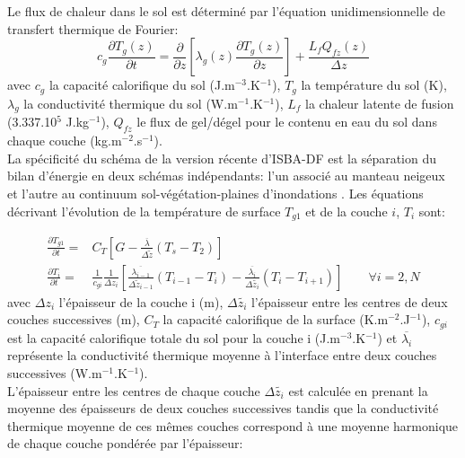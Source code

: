 \noindent Le flux de chaleur dans le sol est déterminé par l'équation unidimensionnelle de transfert thermique de Fourier:
\begin{equation}
\label{eq:heat_trans}
c_{g}\frac{\partial T_{g} (z)}{\partial t} = \frac{\partial }{\partial z}\left[\lambda_{g}(z)\frac{\partial T_{g} (z)}{\partial z}\right] + \frac{L_{f}Q_{fz}(z)}{\Delta z}
\end{equation}
avec $c_{g}$ la capacité calorifique du sol (J.m$^{-3}$.K$^{-1}$), $T_{g}$ la température du sol (K), $\lambda_{g}$ la conductivité thermique du sol (W.m$^{-1}$.K$^{-1}$), $L_{f}$  la chaleur latente de fusion (3.337.10$^{5}$ J.kg$^{-1}$), $Q_{fz}$ le flux de gel/dégel pour le contenu en eau du sol dans chaque couche (kg.m$^{-2}$.s$^{-1}$).\\

\noindent La spécificité du schéma de la version récente d'ISBA-DF est la séparation du bilan d'énergie en deux schémas indépendants: l'un associé au manteau neigeux et l'autre au continuum sol-végétation-plaines d'inondations \citep{decharme2019}. Les équations décrivant l'évolution de la température de surface $T_{g1}$ et de la couche $i$, $T_{i}$ sont:

\begin{align} \label{eq:heat_trans_discret}
\frac{\partial T_{g1}}{\partial t}=& C_{T}[G - \frac{\overline{\lambda}}{\Delta\widetilde{z}}(T_{s}-T_{2})] \\
\frac{\partial T_{i}}{\partial t}=& \frac{1}{c_{gi}}\frac{1}{\Delta z_{i}}[ \frac{\overline{\lambda_{i-1}}}{\Delta\widetilde{z}_{i-1}}(T_{i-1}-T_{i})-\frac{\overline{\lambda_{i}}}{\Delta\widetilde{z_{i}}}(T_{i}-T_{i+1})] \qquad \forall i =2,N
\end{align}
%
avec $\Delta z_{i}$ l'épaisseur de la couche i (m), $\Delta\widetilde{z_{i}}$ l'épaisseur entre les centres de deux couches successives (m), $C_{T}$ la capacité calorifique de la surface (K.m$^{-2}$.J$^{-1}$), $c_{gi}$ est la capacité calorifique totale du sol pour la couche i (J.m$^{-3}$.K$^{-1}$) et $\overline{\lambda_{i}}$ représente la conductivité thermique moyenne à l'interface entre deux couches successives (W.m$^{-1}$.K$^{-1}$).\\

L'épaisseur entre les centres de chaque couche $\Delta\widetilde{z_{i}}$ est calculée en prenant la moyenne des épaisseurs de deux couches successives tandis que la conductivité thermique moyenne de ces mêmes couches correspond à une moyenne harmonique de chaque couche pondérée par l'épaisseur:

